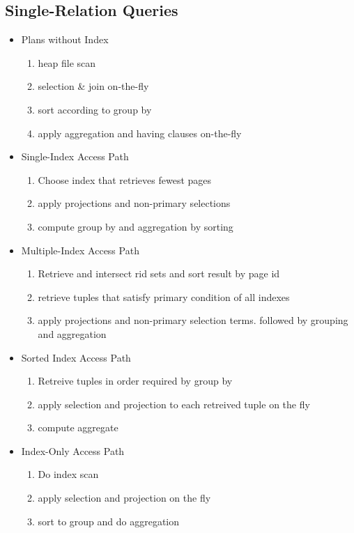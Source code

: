\subsection{Single-Relation Queries}
\begin{itemize}
    \item Plans without Index
    \begin{enumerate}
        \item heap file scan
        \item selection \& join on-the-fly
        \item sort according to group by
        \item apply aggregation and having clauses on-the-fly
    \end{enumerate}
    \item Single-Index Access Path
    \begin{enumerate}
        \item Choose index that retrieves fewest pages
        \item apply projections and non-primary selections
        \item compute group by and aggregation by sorting
    \end{enumerate}
    \item Multiple-Index Access Path
    \begin{enumerate}
        \item Retrieve and intersect rid sets and sort result by page id
        \item retrieve tuples that satisfy primary condition of all indexes
        \item apply projections and non-primary selection terms. followed by grouping and aggregation
    \end{enumerate}
    \item Sorted Index Access Path
    \begin{enumerate}
        \item Retreive tuples in order required by group by
        \item apply selection and projection to each retreived tuple on the fly
        \item compute aggregate
    \end{enumerate}
    \item Index-Only Access Path
    \begin{enumerate}
        \item Do index scan
        \item apply selection and projection on the fly
        \item sort to group and do aggregation
    \end{enumerate}
\end{itemize}

